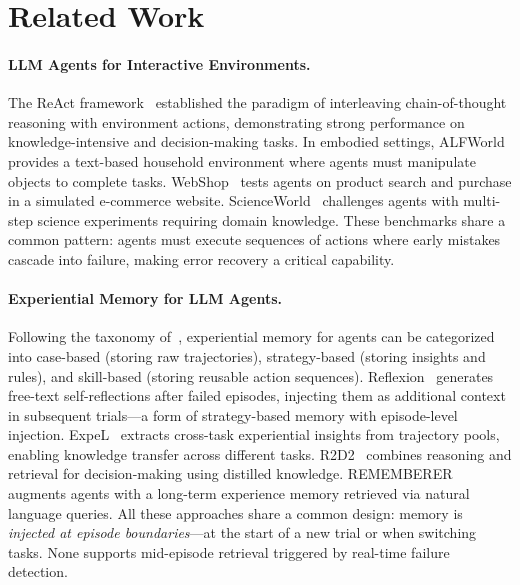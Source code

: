\section{Related Work}
\label{sec:related}

\paragraph{LLM Agents for Interactive Environments.}
The ReAct framework~\citep{yao2023react} established the paradigm of interleaving chain-of-thought reasoning with environment actions, demonstrating strong performance on knowledge-intensive and decision-making tasks. In embodied settings, ALFWorld~\citep{shridhar2021alfworld} provides a text-based household environment where agents must manipulate objects to complete tasks. WebShop~\citep{yao2022webshop} tests agents on product search and purchase in a simulated e-commerce website. ScienceWorld~\citep{wang2022scienceworld} challenges agents with multi-step science experiments requiring domain knowledge. These benchmarks share a common pattern: agents must execute sequences of actions where early mistakes cascade into failure, making error recovery a critical capability.

\paragraph{Experiential Memory for LLM Agents.}
Following the taxonomy of~\citet{liu2025memory}, experiential memory for agents can be categorized into case-based (storing raw trajectories), strategy-based (storing insights and rules), and skill-based (storing reusable action sequences). Reflexion~\citep{shinn2023reflexion} generates free-text self-reflections after failed episodes, injecting them as additional context in subsequent trials---a form of strategy-based memory with episode-level injection. ExpeL~\citep{zhao2024expel} extracts cross-task experiential insights from trajectory pools, enabling knowledge transfer across different tasks. R2D2~\citep{zheng2024r2d2} combines reasoning and retrieval for decision-making using distilled knowledge. REMEMBERER~\citep{majumder2023rememberer} augments agents with a long-term experience memory retrieved via natural language queries. All these approaches share a common design: memory is \emph{injected at episode boundaries}---at the start of a new trial or when switching tasks. None supports mid-episode retrieval triggered by real-time failure detection.

